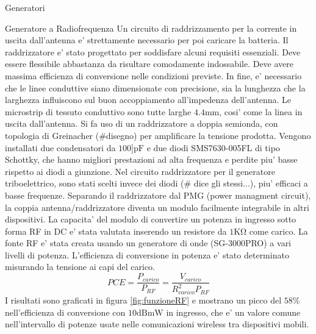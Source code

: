\begin{section}{Generatori}
\begin{subsection}{Generatore a Radiofrequenza}
        Un circuito di raddrizzamento per la corrente in uscita dall'antenna e' strettamente necessario per poi caricare la batteria. Il raddrizzatore e' stato progettato per soddisfare alcuni requisiti essenziali. Deve essere flessibile abbastanza da risultare comodamente indossabile. Deve avere massima efficienza di conversione nelle condizioni previste. In fine, e' necessario che le linee conduttive siano dimensionate con precisione, sia la lunghezza che la larghezza influiscono sul buon accoppiamento all'impedenza dell'antenna. Le microstrip di tessuto conduttivo sono tutte larghe \(4.4\mathrm{mm}\), cosi' come la linea in uscita dall'antenna. Si fa uso di un raddrizzatore a doppia semionda, con topologia di Greinacher (\#disegno) per amplificare la tensione prodotta. Vengono installati due condensatori da \(100]\mathrm{pF}\) e due diodi SMS7630-005FL di tipo Schottky, che hanno migliori prestazioni ad alta frequenza e perdite piu' basse rispetto ai diodi a giunzione. Nel circuito raddrizzatore per il generatore triboelettrico, sono stati scelti invece dei diodi (\# dice gli stessi...), piu' efficaci a basse frequenze. Separando il raddrizzatore dal PMG (power managment circuit), la coppia antenna/raddrizzatore diventa un modulo facilmente integrabile in altri dispositivi. La capacita' del modulo di convertire un potenza in ingresso sotto forma RF in DC e' stata valutata inserendo un resistore da \(1\mathrm{K\Omega}\) come carico. La fonte RF e' stata creata usando un generatore di onde (SG-3000PRO) a vari livelli di potenza. L'efficienza di conversione in potenza e' stato determinato misurando la tensione ai capi del carico. 
        \begin{equation*}
            PCE = \frac{P_{carico}}{P_{RF}} = \frac{V_{carico}}{R_{carico}^2P_{RF}}
        \end{equation*}
        I risultati sono graficati in figura \ref{fig:funzioneRF} e mostrano un picco del \(58\%\) nell'efficienza di conversione con \(10\mathrm{dBmW}\) in ingresso, che e' un valore comune nell'intervallo di potenze usate nelle comunicazioni wireless tra dispositivi mobili. 
    \end{subsection}
\end{section}

